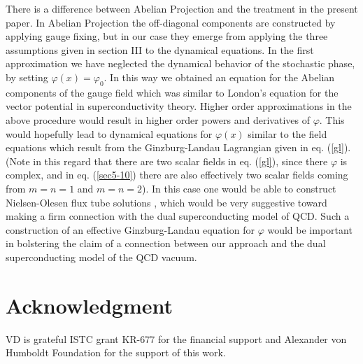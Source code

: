 \documentclass[a4paper,aps,showpacs]{revtex4}
\begin{document}
There is a difference between Abelian Projection and
the treatment in the present paper. In Abelian Projection the
off-diagonal components are constructed by applying gauge
fixing, but in our case they emerge from applying the
three assumptions given in section III to the dynamical
equations. In the first approximation we have
neglected the dynamical behavior of the stochastic phase,
by setting $\varphi (x) = \varphi _0$. In this way
we obtained an equation for the Abelian components
of the gauge field which was similar to London's equation for
the vector potential in superconductivity theory. Higher
order approximations in the above procedure would result in
higher order powers and derivatives of $\varphi$. This would
hopefully lead to dynamical equations for $\varphi (x)$
similar to the field equations which result from
the Ginzburg-Landau Lagrangian given in eq. (\ref{gl}).
(Note in this regard that there are two scalar fields
in eq. (\ref{gl}), since there $\varphi$ is complex, and
in eq. (\ref{sec5-10}) there are also effectively two scalar
fields coming from $m=n=1$ and $m=n=2$).
In this case one would be able to construct Nielsen-Olesen
flux tube solutions \cite{no}, which would be very suggestive
toward making a firm connection with the dual
superconducting model of QCD. Such a construction of
an effective Ginzburg-Landau equation for
$\varphi$ would be important in bolstering the claim of a
connection between our approach and the dual superconducting
model of the QCD vacuum.

\section{Acknowledgment}

VD is grateful ISTC grant KR-677 for the financial support and
Alexander von Humboldt Foundation for the support of this work.
\end{document}
